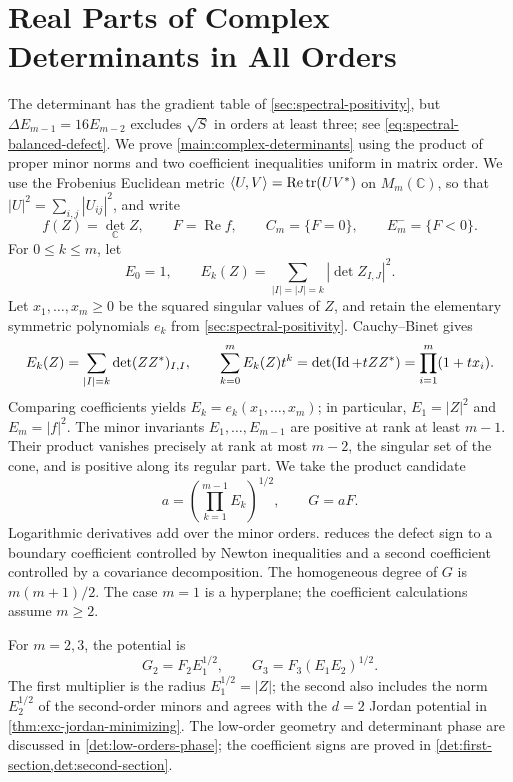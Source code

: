 \section[Complex Determinants]{Real Parts of Complex Determinants in All Orders}
\label{sec:complex-determinants}

The determinant has the gradient table of \cref{sec:spectral-positivity},
but \(\Delta E_{m-1}=16E_{m-2}\) excludes \(\sqrt S\) in orders
at least three; see \eqref{eq:spectral-balanced-defect}.
We prove \cref{main:complex-determinants} using the product of proper
minor norms and two coefficient inequalities uniform in matrix order.
We use the Frobenius Euclidean metric
\(\langle U,V\rangle=\operatorname{Re}\operatorname{tr}(UV^*)\) on
\(M_m(\mathbb C)\), so that \(|U|^2=\sum_{i,j}|U_{ij}|^2\), and write
\[
 f(Z)=\det_{\mathbb C}Z,\qquad F=\operatorname{Re}f,
 \qquad C_m=\{F=0\},\qquad E^-_m=\{F<0\}.
\]
For $0\leq k\leq m$, let
\begin{equation}\label{det:minor-norms}
 E_0=1,\qquad
 E_k(Z)=\sum_{|I|=|J|=k}|\det Z_{I,J}|^2.
\end{equation}
Let $x_1,\ldots,x_m\ge0$ be the squared singular values of $Z$,
and retain the elementary symmetric polynomials $e_k$ from
\cref{sec:spectral-positivity}. Cauchy--Binet gives
\[
 E_k(Z)=\sum_{|I|=k}\det(ZZ^*)_{I,I},\qquad
 \sum_{k=0}^m E_k(Z)t^k
 =\det(\operatorname{Id}+tZZ^*)=\prod_{i=1}^m(1+tx_i).
\]
Comparing coefficients yields $E_k=e_k(x_1,\ldots,x_m)$;
in particular, $E_1=|Z|^2$ and $E_m=|f|^2$.
The minor invariants $E_1,\ldots,E_{m-1}$ are positive at rank
at least $m-1$. Their product vanishes precisely at rank at most
$m-2$, the singular set of the cone, and is positive along its
regular part.
We take the product candidate
\begin{equation}\label{det:potential}
 a=\left(\prod_{k=1}^{m-1}E_k\right)^{1/2},\qquad G=aF.
\end{equation}
Logarithmic derivatives add over the minor orders.
 reduces the defect sign to a boundary
coefficient controlled by Newton inequalities and a second coefficient
controlled by a covariance decomposition.
The homogeneous degree of $G$ is $m(m+1)/2$.
The case $m=1$ is a hyperplane; the coefficient calculations assume $m\geq2$.

For $m=2,3$, the potential is
\[
 G_2=F_2E_1^{1/2},\qquad G_3=F_3(E_1E_2)^{1/2}.
\]
The first multiplier is the radius $E_1^{1/2}=|Z|$; the second also
includes the norm $E_2^{1/2}$ of the second-order minors and agrees
with the \(d=2\) Jordan potential in \cref{thm:exc-jordan-minimizing}.
The low-order geometry and determinant phase are discussed in
\cref{det:low-orders-phase}; the coefficient signs are proved in
\cref{det:first-section,det:second-section}.

